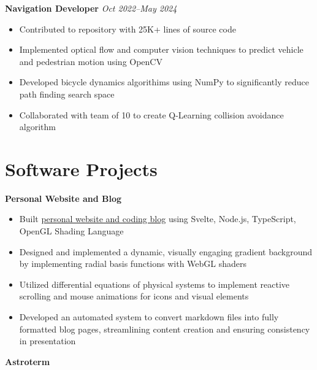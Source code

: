 \documentclass[letterpaper,10pt]{article}
\newcommand{\position}[2]{
    \vspace{5pt}
    {\normalsize \textbf {#1}}
    \hfill
    {\normalsize \textit{#2}}
    \\
}
\newcommand{\itemsBegin}{
    \begin{itemize}[leftmargin=0.2in, labelsep=0.05in, itemsep=0pt, parsep=1pt, topsep=0pt, partopsep=0pt]
    \small
}
\newcommand{\itemsEnd}{\end{itemize}}
\begin{document}
    \position{Navigation Developer}{Oct 2022--May 2024}
    \itemsBegin{}
        \item Contributed to repository with 25K+ lines of source code
        \item Implemented optical flow and computer vision techniques to predict vehicle and pedestrian motion using OpenCV
        \item Developed bicycle dynamics algorithims using NumPy to significantly reduce path finding search space
        \item Collaborated with team of 10 to create Q-Learning collision avoidance algorithm
    \itemsEnd{}

\section{Software Projects}

    \normalsize \textbf{Personal Website and Blog}

    \itemsBegin{}
        \item Built \href{https://www.daltonluce.com/}{\underline{personal website and coding blog}} using Svelte, Node.js, TypeScript, OpenGL Shading Language
        \item Designed and implemented a dynamic, visually engaging gradient background by implementing radial basis functions with WebGL shaders
        \item Utilized differential equations of physical systems to implement reactive scrolling and mouse animations for icons and visual elements
        \item Developed an automated system to convert markdown files into fully formatted blog pages, streamlining content creation and ensuring consistency in presentation
    \itemsEnd{}

    \normalsize \textbf{Astroterm}
\end{document}
